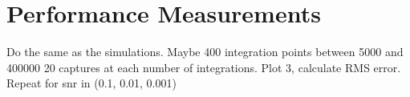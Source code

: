 \section{Performance Measurements}

Do the same as the simulations.
Maybe 400 integration points between 5000 and 400000
20 captures at each number of integrations.
Plot 3, calculate RMS error.
Repeat for snr in (0.1, 0.01, 0.001)
